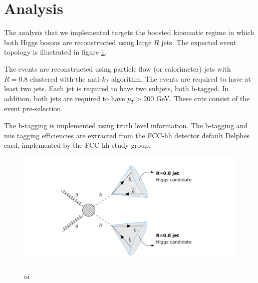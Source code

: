 
\section{Analysis}
\label{sec:imple}


The analysis that we implemented targets the boosted kinematic regime in which both Higgs bosons are reconstructed using large $R$ jets. The expected event topology is illustrated in figure \ref{fig:boosted}.

The events are reconstructed using particle flow (or calorimeter) jets with $R=0.8$ clustered with the anti-$k_T$ algorithm. The events are required to have at least two jets. Each jet is required to have two subjets, both b-tagged. In addition, both jets are required to have $p_T>200$ GeV. These cuts consist of the event pre-selection.

The b-tagging is implemented using truth level information. The b-tagging and mis tagging efficiencies are extracted from the FCC-hh detector default Delphes card, implemented by the FCC-hh study group.

\begin{figure}[h]
	\centering
	\includegraphics[trim={4.5cm .5cm 1cm .5cm},clip,width=1.2\linewidth]{./images/boosted1.png}
	\label{fig:boosted}
	\caption{oi}
\end{figure}

